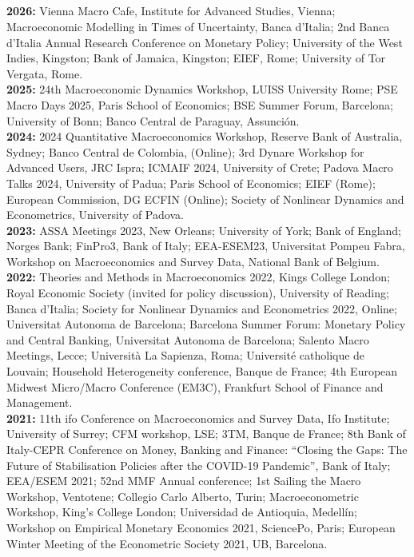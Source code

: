 \documentclass[margin, 11pt]{res} %
\begin{document}
\begin{resume}
\section{}
\textbf{2026:} {Vienna Macro Cafe, Institute for Advanced Studies, Vienna; Macroeconomic Modelling in Times of Uncertainty, Banca d'Italia; 2nd Banca d'Italia Annual Research Conference
on Monetary Policy; University of the West Indies, Kingston; Bank of Jamaica, Kingston; EIEF, Rome; University of Tor Vergata, Rome.}
\\
\textbf{2025:} {24th Macroeconomic Dynamics Workshop, LUISS University Rome; PSE Macro Days 2025, Paris School of Economics; BSE Summer Forum, Barcelona; University of Bonn; Banco Central de Paraguay, Assunción.}
\\
\textbf{2024:} {2024 Quantitative Macroeconomics Workshop, Reserve Bank of Australia, Sydney; Banco Central de Colombia, (Online); 3rd Dynare Workshop for Advanced Users, JRC Ispra; ICMAIF 2024, University of Crete; Padova Macro Talks 2024, University of Padua; Paris School of Economics; EIEF (Rome); European Commission, DG ECFIN (Online); Society of Nonlinear Dynamics and Econometrics, University of Padova.}
\\
\textbf{2023:} {ASSA Meetings 2023, New Orleans; University of York; Bank of England; Norges Bank; FinPro3, Bank of Italy; EEA-ESEM23, Universitat Pompeu Fabra, Workshop on Macroeconomics and Survey Data, National Bank of Belgium.}
\\
\textbf{2022:} {Theories and Methods in Macroeconomics 2022, Kings College London; Royal Economic Society (invited for policy discussion), University of Reading; Banca d'Italia; Society for Nonlinear Dynamics and Econometrics 2022, Online; Universitat Autonoma de Barcelona; Barcelona Summer Forum: Monetary Policy and Central Banking, Universitat Autonoma de Barcelona; Salento Macro Meetings, Lecce; Universit\`{a} La Sapienza, Roma; Universit\'{e} catholique de Louvain; Household Heterogeneity conference, Banque de France; 4th European Midwest Micro/Macro Conference (EM3C), Frankfurt School of Finance and Management.}
\\
\textbf{2021:} {11th ifo Conference on Macroeconomics and Survey Data, Ifo Institute; University of Surrey; CFM workshop, LSE; 3TM, Banque de France; 8th Bank of Italy-CEPR Conference on Money, Banking and Finance: “Closing the Gaps: The Future of Stabilisation Policies after the COVID-19 Pandemic”, Bank of Italy; EEA/ESEM 2021; 52nd MMF Annual conference; 1st Sailing the Macro Workshop, Ventotene; Collegio Carlo Alberto, Turin; Macroeconometric Workshop, King's College London; Universidad de Antioquia, Medell\'{i}n; Workshop on Empirical Monetary Economics 2021, SciencePo, Paris; European Winter Meeting of the Econometric Society 2021, UB, Barcelona.}

\end{resume}
\end{document}
